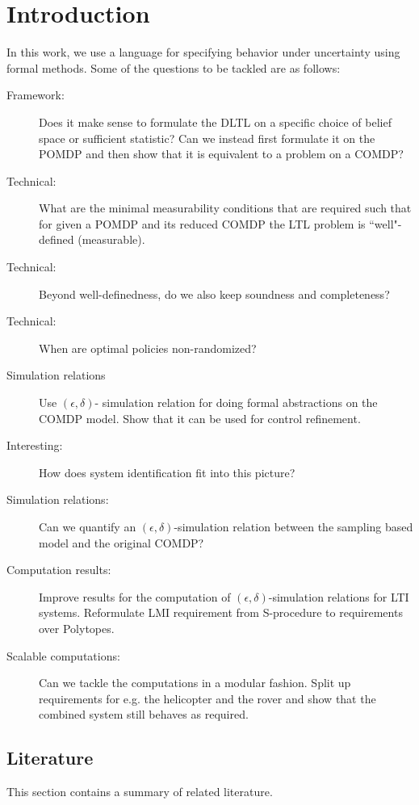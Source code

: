 \documentclass{ifacconf}
\begin{document}
\section{Introduction} \label{subsec:intro}
In this work, we use a language for specifying behavior under uncertainty using formal methods. 
Some of the questions to be tackled are as follows:
\begin{description}
	\item[Framework:] Does it make sense to formulate the DLTL on a specific choice of belief space or sufficient statistic? Can we instead first formulate it on the POMDP and then show that it  is equivalent to a problem on a COMDP?
	\item[Technical:]  What are the minimal measurability conditions that are required such that for given a POMDP and its reduced COMDP  the LTL problem is ``well"-defined (measurable).
	\item[Technical:] Beyond well-definedness, do we also keep soundness and completeness?
	\item[Technical:] When are optimal policies non-randomized?
	\item[Simulation relations]  Use $(\epsilon,\delta)$- simulation relation for doing formal abstractions on the COMDP model.
	Show that it can be used for control refinement.
	\item[Interesting:] How does system identification fit into this picture?
	\item[Simulation relations:] Can we quantify an $(\epsilon,\delta)$-simulation relation between the sampling based model and the original COMDP?
	\item[Computation results:] Improve results for the computation of $(\epsilon,\delta)$-simulation relations for LTI systems. Reformulate LMI requirement from S-procedure to requirements over Polytopes. 
	\item[Scalable computations:] Can we  tackle the computations in a modular fashion. Split up requirements for e.g. the helicopter and the rover and show that the combined system still behaves as required.
	 
\end{description}


\subsection{Literature}
This section contains a summary of related literature.
\end{document}
